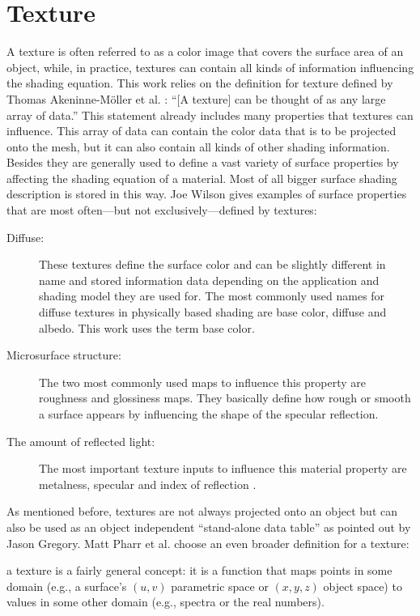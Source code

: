 \section{Texture}\label{chapter:texture}
	A texture is often referred to as a color image that covers the surface area of an object, while, in practice, textures can contain all kinds of information influencing the shading equation. This work relies on the definition for texture defined by Thomas Akeninne-Möller et al. \cite[p.\,32--36]{akenine2008real}: ``[A texture] can be thought of as any large array of data.'' This statement already includes many properties that textures can influence. This array of data can contain the color data that is to be projected onto the mesh, but it can also contain all kinds of other shading information. Besides they are generally used to define a vast variety of surface properties by affecting the shading equation \cite[p.\,180--181]{akenine2008real} of a material.  Most of all bigger surface shading description is stored in this way. Joe Wilson \cite{wilson2015physically} gives examples of surface properties that are most often---but not exclusively---defined by textures:
	\begin{description}
		\item[Diffuse:] These textures define the surface color and can be slightly different in name and stored information data depending on the application and shading model they are used for. The most commonly used names for diffuse textures in physically based shading are base color, diffuse and albedo. This work uses the term base color. 
		\item[Microsurface structure:] The two most commonly used maps to influence this property are roughness and glossiness maps. They basically define how rough or smooth a surface appears by influencing the shape of the specular reflection.
		\item[The amount of reflected light:] The most important texture inputs to influence this material property are metalness, specular and index of reflection \cite{wilson2015physically}.
	\end{description}
	As mentioned before, textures are not always projected onto an object but can also be used as an object independent ``stand-alone data table'' \cite[p.\,462]{gregory2015game} as pointed out by Jason Gregory. Matt Pharr et al. \cite[p.\,597]{pharr2016physically} choose an even broader definition for a texture:
	
	\begin{itquote}
		[\ldots] a texture is a fairly general concept: it is a function that maps points in some domain (e.g., a surface’s $(u, v)$ parametric space or $(x, y, z)$ object space) to values in some other domain (e.g., spectra or the real numbers).
	\end{itquote} %
	
